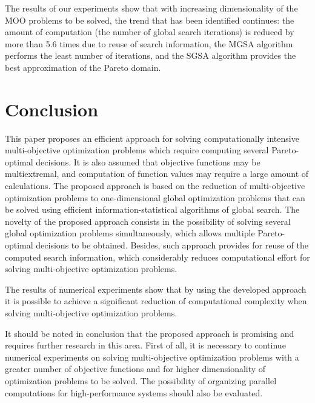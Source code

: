 \documentclass[runningheads]{llncs}
\begin{document}
The results of our experiments show that with increasing dimensionality of the MOO problems to be solved, the trend that has been identified continues: the amount of computation (the number of global search iterations) is reduced by more than 5.6 times due to reuse of search information, the MGSA algorithm performs the least number of iterations, and the SGSA algorithm provides the best approximation of the Pareto domain.

\section*{Conclusion}

This paper proposes an efficient approach for solving computationally intensive multi-objective optimization problems which require computing several Pareto-optimal decisions. It is also assumed that objective functions may be multiextremal, and computation of function values may require a large amount of calculations. The proposed approach is based on the reduction of multi-objective optimization problems to one-dimensional global optimization problems that can be solved using efficient information-statistical algorithms of global search.  The novelty of the proposed approach consists in the possibility of solving several global optimization problems simultaneously, which allows multiple Pareto-optimal decisions to be obtained. Besides, such approach provides for reuse of the computed search information, which considerably reduces computational effort for solving multi-objective optimization problems. 

The results of numerical experiments show that by using the developed approach it is possible to achieve a significant reduction of computational complexity when solving multi-objective optimization problems. 

It should be noted in conclusion that the proposed approach is promising and requires further research in this area. First of all, it is necessary to continue numerical experiments on solving multi-objective optimization problems with a greater number of objective functions and for higher dimensionality of optimization problems to be solved. The possibility of organizing parallel computations for high-performance systems should also be evaluated.
\end{document}
